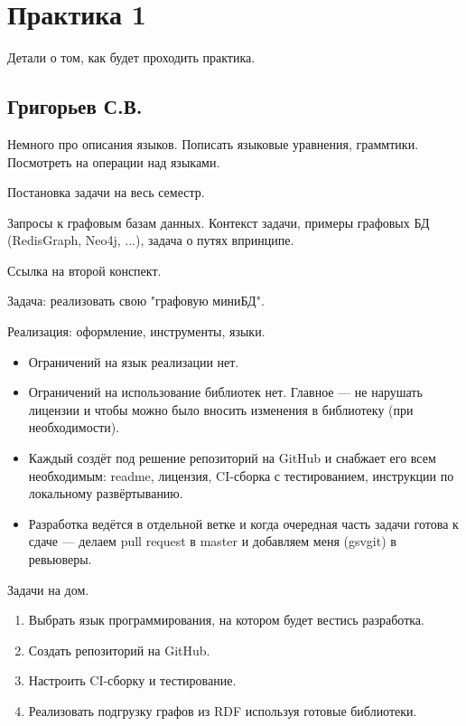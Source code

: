 \section{Практика 1}

Детали о том, как будет проходить практика.

\subsection{Григорьев С.В.}

Немного про описания языков.
Пописать языковые уравнения, граммтики.
Посмотреть на операции над языками.

Постановка задачи на весь семестр.

Запросы к графовым базам данных.
Контекст задачи, примеры графовых БД (RedisGraph, Neo4j, ...), задача о путях впринципе.

Ссылка на второй конспект.

Задача: реализовать свою "графовую миниБД".

Реализация: оформление, инструменты, языки.

\begin{itemize}
  \item Ограничений на язык реализации нет.
  \item Ограничений на использование библиотек нет. Главное --- не нарушать лицензии и чтобы можно было вносить изменения в библиотеку (при необходимости).
  \item Каждый создёт под решение репозиторий на GitHub и снабжает его всем необходимым: readme, лицензия, CI-сборка с тестированием, инструкции по локальному развёртыванию.
  \item Разработка ведётся в отдельной ветке и когда очередная часть задачи готова к сдаче --- делаем pull request в master и добавляем меня (gsvgit) в ревьюверы.
\end{itemize}


Задачи на дом.
\begin{enumerate}
  \item Выбрать язык программирования, на котором будет вестись разработка.
  \item Создать репозиторий на GitHub.
  \item Настроить CI-сборку и тестирование.
  \item Реализовать подгрузку графов из RDF используя готовые библиотеки.
\end{enumerate}
